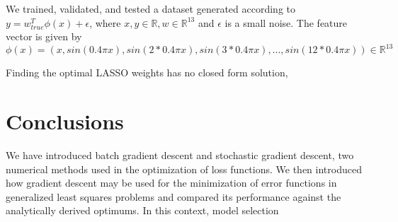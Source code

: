 \documentclass[12pt]{article}
\newcommand{\R}{\mathbb{R}}
\begin{document}
We trained, validated, and tested a dataset generated according to $y=w_{true}^T\phi(x) + \epsilon$, where $x,y \in \R, w \in \R^{13}$ and $\epsilon$ is a small noise. The feature vector is given by
$$ \phi(x) = (x, sin(0.4\pi x), sin(2*0.4\pi x), sin(3*0.4\pi x),...,sin(12*0.4\pi x)) \in \R^13$$

Finding the optimal LASSO weights has no closed form solution,

\section{Conclusions}

We have introduced batch gradient descent and stochastic gradient descent, two numerical methods used in the optimization of loss functions. We then introduced how gradient descent may be used for the minimization of error functions in generalized least squares problems and compared its performance against the analytically derived optimums. In this context, model selection

 
\end{document}

